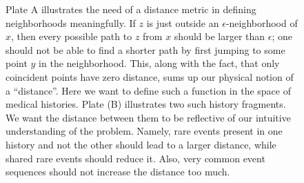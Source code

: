 \documentclass[twocolumn, compsoc,9pt]{IEEEtran}
\renewcommand{\captionN}[1]{\caption{\color{darkgray} \sffamily \fontsize{8}{10}\selectfont #1  }}
\begin{document}
{\begin{figure}[t]
\captionN{Plate A illustrates the need of a distance metric in defining neighborhoods meaningfully. If $z$ is just outside an $\epsilon$-neighborhood of $x$, then every possible path to $z$ from $x$ should be larger than $\epsilon$; one should not be able to find a shorter path by first jumping to some point $y$ in the neighborhood. This, along with the fact, that only coincident points have zero distance, sums up our physical notion of a ``distance''. Here we want to define such a function in the space of medical histories. Plate (B) illustrates two such  history fragments. We want the distance between them to be reflective of our intuitive understanding of the problem. Namely, rare events present in one history and not the other should lead to a larger distance, while shared rare events should reduce it. Also, very common event sequences should not increase the distance too much. }\label{fig0}
\end{figure}
\begin{figure}[t]
\centering


\end{figure}}
\end{document}
